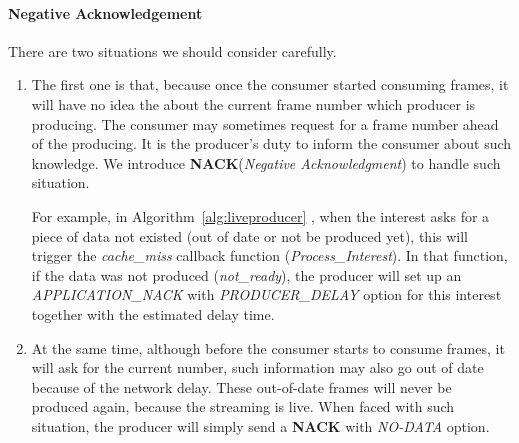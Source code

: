 \paragraph{Negative Acknowledgement} %
\label{par:negative_acknowledgement}
There are two situations we should consider carefully. 
\begin{enumerate}
	\item The first one is that, because once the consumer started consuming frames, it will have no idea the about the current frame number which producer is producing. The consumer may sometimes request for a frame number ahead of the producing. It is the producer's duty to inform the consumer about such knowledge. We introduce \textbf{NACK}(\textit{Negative Acknowledgment}) to handle such situation. 

	For example, in Algorithm~\ref{alg:liveproducer} , when the interest asks for a piece of data not existed (out of date or not be produced yet), this will trigger the \textit{cache\_miss} callback function (\textit{Process\_Interest}). In that function, if the data was not produced (\textit{not\_ready}), the producer will set up an \textit{APPLICATION\_NACK} with \textit{PRODUCER\_DELAY} option for this interest together with the estimated delay time.

	\item At the same time, although before the consumer starts to consume frames, it will ask for the current number, such information may also go out of date because of the network delay. These out-of-date frames will never be produced again, because the streaming is live. When faced with such situation, the producer will simply send a \textbf{NACK} with \textit{NO-DATA} option.
\end{enumerate}

